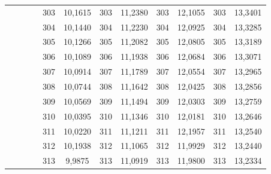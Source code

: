 \documentclass[a4paper,12pt]{article} %
\begin{document}
\begin{longtable}[c]{cccccccccc|c|c|}
	&  &  & \multicolumn{1}{c|}{} & \multicolumn{1}{c|}{303} & \multicolumn{1}{c|}{10,1615} & \multicolumn{1}{c|}{303} & \multicolumn{1}{c|}{11,2380} & \multicolumn{1}{c|}{303} & 12,1055 & 303 & 13,3401 \\ \cline{5-12} 
	&  &  & \multicolumn{1}{c|}{} & \multicolumn{1}{c|}{304} & \multicolumn{1}{c|}{10,1440} & \multicolumn{1}{c|}{304} & \multicolumn{1}{c|}{11,2230} & \multicolumn{1}{c|}{304} & 12,0925 & 304 & 13,3285 \\ \cline{5-12} 
	&  &  & \multicolumn{1}{c|}{} & \multicolumn{1}{c|}{305} & \multicolumn{1}{c|}{10,1266} & \multicolumn{1}{c|}{305} & \multicolumn{1}{c|}{11,2082} & \multicolumn{1}{c|}{305} & 12,0805 & 305 & 13,3189 \\ \cline{5-12} 
	&  &  & \multicolumn{1}{c|}{} & \multicolumn{1}{c|}{306} & \multicolumn{1}{c|}{10,1089} & \multicolumn{1}{c|}{306} & \multicolumn{1}{c|}{11,1938} & \multicolumn{1}{c|}{306} & 12,0684 & 306 & 13,3071 \\ \cline{5-12} 
	&  &  & \multicolumn{1}{c|}{} & \multicolumn{1}{c|}{307} & \multicolumn{1}{c|}{10,0914} & \multicolumn{1}{c|}{307} & \multicolumn{1}{c|}{11,1789} & \multicolumn{1}{c|}{307} & 12,0554 & 307 & 13,2965 \\ \cline{5-12} 
	&  &  & \multicolumn{1}{c|}{} & \multicolumn{1}{c|}{308} & \multicolumn{1}{c|}{10,0744} & \multicolumn{1}{c|}{308} & \multicolumn{1}{c|}{11,1642} & \multicolumn{1}{c|}{308} & 12,0425 & 308 & 13,2856 \\ \cline{5-12} 
	&  &  & \multicolumn{1}{c|}{} & \multicolumn{1}{c|}{309} & \multicolumn{1}{c|}{10,0569} & \multicolumn{1}{c|}{309} & \multicolumn{1}{c|}{11,1494} & \multicolumn{1}{c|}{309} & 12,0303 & 309 & 13,2759 \\ \cline{5-12} 
	&  &  & \multicolumn{1}{c|}{} & \multicolumn{1}{c|}{310} & \multicolumn{1}{c|}{10,0395} & \multicolumn{1}{c|}{310} & \multicolumn{1}{c|}{11,1346} & \multicolumn{1}{c|}{310} & 12,0181 & 310 & 13,2646 \\ \cline{5-12} 
	&  &  & \multicolumn{1}{c|}{} & \multicolumn{1}{c|}{311} & \multicolumn{1}{c|}{10,0220} & \multicolumn{1}{c|}{311} & \multicolumn{1}{c|}{11,1211} & \multicolumn{1}{c|}{311} & 12,1957 & 311 & 13,2540 \\ \cline{5-12} 
	&  &  & \multicolumn{1}{c|}{} & \multicolumn{1}{c|}{312} & \multicolumn{1}{c|}{10,1938} & \multicolumn{1}{c|}{312} & \multicolumn{1}{c|}{11,1065} & \multicolumn{1}{c|}{312} & 11,9929 & 312 & 13,2440 \\ \cline{5-12} 
	&  &  & \multicolumn{1}{c|}{} & \multicolumn{1}{c|}{313} & \multicolumn{1}{c|}{9,9875} & \multicolumn{1}{c|}{313} & \multicolumn{1}{c|}{11,0919} & \multicolumn{1}{c|}{313} & 11,9800 & 313 & 13,2334 \\ \cline{5-12} 

\end{longtable}
\end{document}
